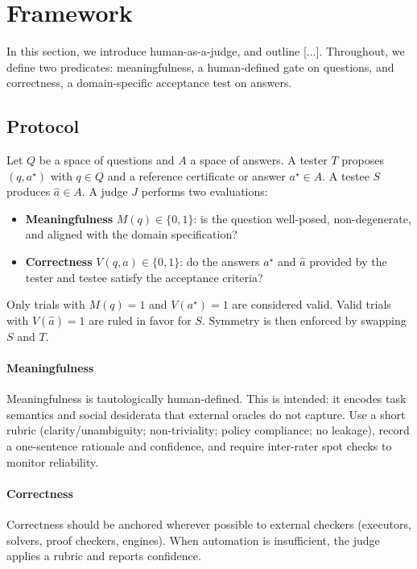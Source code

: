 \documentclass{article} %
\begin{document}
\section{Framework}

In this section, we introduce human-as-a-judge, and outline [...]. Throughout, we define two predicates: meaningfulness, a human-defined gate on questions, and correctness, a domain-specific acceptance test on answers.

\subsection{Protocol}

Let $Q$ be a space of questions and $A$ a space of answers. A tester $T$ proposes $(q, a^\star)$ with $q \in Q$ and a reference certificate or answer $a^\star \in A$. A testee $S$ produces $\hat a \in A$. A judge $J$ performs two evaluations:
\begin{itemize}
    \item \textbf{Meaningfulness} $M(q) \in \{0, 1\}$: is the question well-posed, non-degenerate, and aligned with the domain specification?
    \item \textbf{Correctness} $V(q, a) \in \{0, 1\}$: do the answers $a^\star$ and $\hat a$ provided by the tester and testee satisfy the acceptance criteria?
\end{itemize}
Only trials with $M(q) = 1$ and $V(a^\star) = 1$ are considered valid. Valid trials with $V(\hat a) = 1$ are ruled in favor for $S$. Symmetry is then enforced by swapping $S$ and $T$.

\paragraph{Meaningfulness} Meaningfulness is tautologically human-defined. This is intended: it encodes task semantics and social desiderata that external oracles do not capture. Use a short rubric (clarity/unambiguity; non-triviality; policy compliance; no leakage), record a one-sentence rationale and confidence, and require inter-rater spot checks to monitor reliability.

\paragraph{Correctness} Correctness should be anchored wherever possible to external checkers (executors, solvers, proof checkers, engines). When automation is insufficient, the judge applies a rubric and reports confidence.
\end{document}
